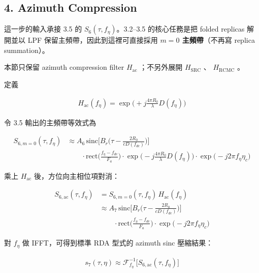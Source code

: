 \documentclass[10pt]{article}
\begin{document}
\hypertarget{azimuth-compression}{%
\subsection{4. Azimuth Compression}\label{azimuth-compression}}

這一步的輸入承接 3.5 的 \(S_6(\tau,f_\eta)\)。3.2--3.5 的核心任務是把
folded replicas 解開並以 LPF 保留主頻帶，因此到這裡可直接採用
\textbf{\(m=0\) 主頻帶}（不再寫 replica summation）。

本節只保留 azimuth compression filter \(H_{\mathrm{ac}}\) ；不另外展開
\(H_{\mathrm{SRC}}\) 、 \(H_{\mathrm{RCMC}}\) 。

定義

\begin{equation}
\begin{aligned} H_{\mathrm{ac}}(f_\eta) = \exp\biggl(+j\frac{4\pi R_0}{\lambda}D(f_\eta)\biggr) \end{aligned}
\end{equation}

令 3.5 輸出的主頻帶等效式為

\begin{equation}
\begin{aligned}
S_{6,m=0}(\tau,f_\eta)
&\approx
A_6\,
\mathrm{sinc}\biggl[B_r\biggl(\tau-\frac{2R_0}{cD(f_{dc})}\biggr)\biggr]\\
&\qquad \cdot \mathrm{rect}\biggl(\frac{f_\eta-f_{dc}}{F_a}\biggr)
\cdot \exp\biggl(-j\frac{4\pi R_0}{\lambda}D(f_\eta)\biggr)
\cdot \exp\biggl(-j2\pi f_\eta\eta_c\biggr)
\end{aligned}
\end{equation}

乘上 \(H_{\mathrm{ac}}\) 後，方位向主相位項對消：

\begin{equation}
\begin{aligned}
S_{6,\mathrm{ac}}(\tau,f_\eta)
&=
S_{6,m=0}(\tau,f_\eta)\,H_{\mathrm{ac}}(f_\eta)\\
&\approx
A_7\,
\mathrm{sinc}\biggl[B_r\biggl(\tau-\frac{2R_0}{cD(f_{dc})}\biggr)\biggr]\\
&\qquad \cdot \mathrm{rect}\biggl(\frac{f_\eta-f_{dc}}{F_a}\biggr)
\cdot \exp\biggl(-j2\pi f_\eta\eta_c\biggr)
\end{aligned}
\end{equation}

對 \(f_\eta\) 做 IFFT，可得到標準 RDA 型式的 azimuth sinc 壓縮結果：

\begin{equation}
\begin{aligned}
s_7(\tau,\eta) \approx \mathcal{F}^{-1}_{f_\eta}\biggl[ S_{6,\mathrm{ac}}(\tau,f_\eta) \biggr]
\end{aligned}
\end{equation}
\end{document}
